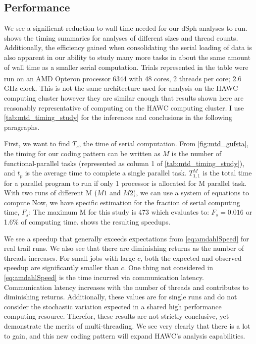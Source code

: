 \subsection{Performance}\label{sec:mtd_performance}



We see a significant reduction to wall time needed for our dSph analyses to run.
 shows the timing summaries for analyses of different sizes and thread counts.
Additionally, the efficiency gained when consolidating the serial loading of data is also apparent in our ability to study many more tasks in about the same amount of wall time as a smaller serial computation.
Trials represented in the table were run on an AMD Opteron\textsuperscript{\textregistered} processor 6344 with 48 cores, 2 threads per core; 2.6 GHz clock.
This is not the same architecture used for analysis on the HAWC computing cluster however they are similar enough that results shown here are reasonably representative of computing on the HAWC computing cluster.
I use \cref{tab:mtd_timing_study} for the inferences and conclusions in the following paragraphs.

First, we want to find $T_s$, the time of serial computation.
From \cref{fig:mtd_gufsta}, the timing for our coding pattern can be written as
\TimingAll
$M$ is the number of functional-parallel tasks (represented as column 1 of \cref{tab:mtd_timing_study}), and $t_p$ is the average time to complete a single parallel task.
$T^M_{1,1}$ is the total time for a parallel program to run if only 1 processor is allocated for M parallel task.
With two runs of different M ($M1$ and $M2$), we can use a system of equations to compute
Now, we have specific estimation for the fraction of serial computing time, $F_s$:
The maximum M for this study is 473 which evaluates to: $F_s = 0.016$ or 1.6\% of computing time.
 shows the resulting speedups.


We see a speedup that generally exceeds expectations from \cref{eq:amdahlSpeed} for real trail runs.
We also see that there are diminishing returns as the number of threads increases.
For small jobs with large $c$, both the expected and observed speedup are significantly smaller than $c$.
One thing not considered in \cref{eq:amdahlSpeed} is the time incurred via communication latency.
Communication latency increases with the number of threads and contributes to diminishing returns.
Additionally, these values are for single runs and do not consider the stochastic variation expected in a shared high performance computing resource.
Therefor, these results are not strictly conclusive, yet demonstrate the merits of multi-threading.
We see very clearly that there is a lot to gain, and this new coding pattern will expand HAWC's analysis capabilities.

